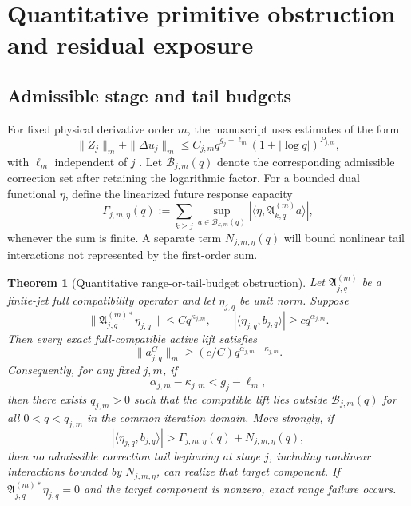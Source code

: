 \documentclass[12pt]{article}
\theoremstyle{plain}
\newtheorem{theorem}{Theorem}[section]
\theoremstyle{definition}
\theoremstyle{remark}
\newcommand{\Comp}{\mathfrak A}
\newcommand{\Budget}{\mathcal B}
\begin{document}
\section{Quantitative primitive obstruction and residual exposure}\label{sec:quant-obstruction}
\subsection{Admissible stage and tail budgets}
For fixed physical derivative order \(m\), the manuscript uses estimates of the form
\[
\|Z_j\|_m+\|\Delta u_j\|_m
\le C_{j,m}q^{g_j-\ell_m}(1+|\log q|)^{P_{j,m}},
\]
with \(\ell_m\) independent of \(j\) \cite[Lemmas~5.4 and 9.8]{OpenAI2026}. Let \(\Budget_{j,m}(q)\) denote the corresponding admissible correction set after retaining the logarithmic factor. For a bounded dual functional \(\eta\), define the linearized future response capacity
\[
\Gamma_{j,m,\eta}(q)
:=\sum_{k\ge j}\sup_{a\in\Budget_{k,m}(q)}
|\langle\eta,\Comp_{k,q}^{(m)}a\rangle|,
\]
whenever the sum is finite. A separate term \(N_{j,m,\eta}(q)\) will bound nonlinear tail interactions not represented by the first-order sum.

\begin{theorem}[Quantitative range-or-tail-budget obstruction]\label{thm:budget}
Let \(\Comp_{j,q}^{(m)}\) be a finite-jet full compatibility operator and let \(\eta_{j,q}\) be unit norm. Suppose
\[
\|\Comp_{j,q}^{(m)*}\eta_{j,q}\|\le Cq^{\kappa_{j,m}},
\qquad
|\langle\eta_{j,q},b_{j,q}\rangle|\ge cq^{\alpha_{j,m}}.
\]
Then every exact full-compatible active lift satisfies
\[
\boxed{\|a^C_{j,q}\|_m\ge(c/C)q^{\alpha_{j,m}-\kappa_{j,m}}.}
\]
Consequently, for any fixed \(j,m\), if
\[
\alpha_{j,m}-\kappa_{j,m}<g_j-\ell_m,
\]
then there exists \(q_{j,m}>0\) such that the compatible lift lies outside \(\Budget_{j,m}(q)\) for all \(0<q<q_{j,m}\) in the common iteration domain. More strongly, if
\[
|\langle\eta_{j,q},b_{j,q}\rangle|
>\Gamma_{j,m,\eta}(q)+N_{j,m,\eta}(q),
\]
then no admissible correction tail beginning at stage \(j\), including nonlinear interactions bounded by \(N_{j,m,\eta}\), can realize that target component. If \(\Comp_{j,q}^{(m)*}\eta_{j,q}=0\) and the target component is nonzero, exact range failure occurs.
\end{theorem}
\end{document}

